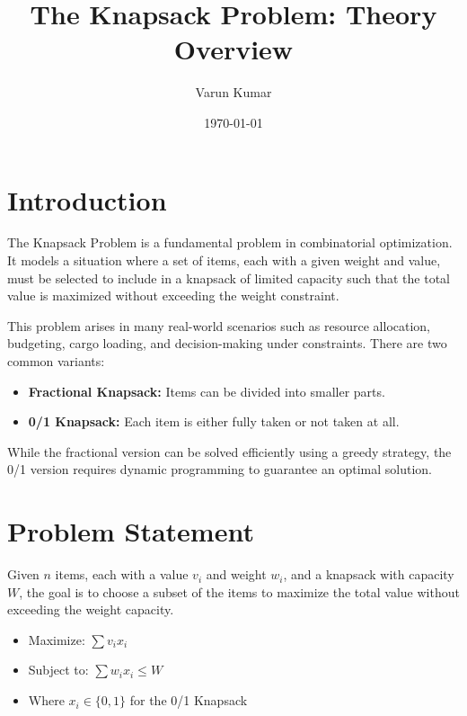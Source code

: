 \documentclass[14pt]{extarticle}
\title{The Knapsack Problem: Theory Overview}
\author{Varun Kumar}
\date{\today}
\begin{document}
\maketitle

\newpage
\tableofcontents
\newpage
\lstlistoflistings
\listofalgorithms
\newpage

\section{Introduction}

The Knapsack Problem is a fundamental problem in combinatorial optimization. It models a situation where a set of items, each with a given weight and value, must be selected to include in a knapsack of limited capacity such that the total value is maximized without exceeding the weight constraint. 

This problem arises in many real-world scenarios such as resource allocation, budgeting, cargo loading, and decision-making under constraints. There are two common variants:

\begin{itemize}[label=\textbullet]
    \item \textbf{Fractional Knapsack:} Items can be divided into smaller parts.
    \item \textbf{0/1 Knapsack:} Each item is either fully taken or not taken at all.
\end{itemize}

While the fractional version can be solved efficiently using a greedy strategy, the 0/1 version requires dynamic programming to guarantee an optimal solution.
 

\section{Problem Statement}

Given $n$ items, each with a value $v_i$ and weight $w_i$, and a knapsack with capacity $W$, the 
goal is to choose a subset of the items to maximize the total value without exceeding the weight capacity.

\begin{itemize}[label=\textbullet]
    \item Maximize: $\sum v_i x_i$
    \item Subject to: $\sum w_i x_i \leq W$
    \item Where $x_i \in \{0, 1\}$ for the 0/1 Knapsack
\end{itemize}
\end{document}
